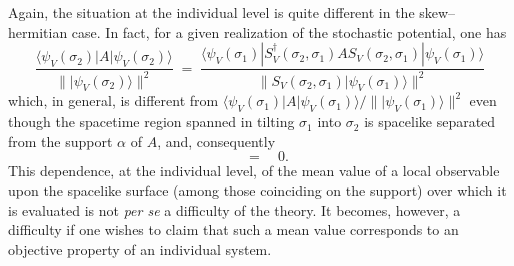 \documentclass[10pt,a4paper]{article}
\begin{document}
Again, the situation at the individual level is quite different in
the skew--hermitian case. In fact, for a given realization of the
stochastic potential, one has
\begin{equation}
\frac{\langle \psi_{V}(\sigma_{2})| A | \psi_{V}(\sigma_{2})
\rangle}{\| |\psi_{V}(\sigma_{2})\rangle \|^{2}} \; = \;
\frac{\langle \psi_{V}(\sigma_{1})| S_{V}^{\dagger}(\sigma_{2},
\sigma_{1}) A S_{V}(\sigma_{2}, \sigma_{1}) | \psi_{V}(\sigma_{1})
\rangle}{\| S_{V}(\sigma_{2}, \sigma_{1})
|\psi_{V}(\sigma_{1})\rangle \|^{2}}
\end{equation}
which, in general, is different from $\langle
\psi_{V}(\sigma_{1})| A | \psi_{V}(\sigma_{1}) \rangle/\|
|\psi_{V}(\sigma_{1})\rangle \|^{2}$ even though the spacetime
region spanned in tilting $\sigma_{1}$ into $\sigma_{2}$ is
spacelike separated from the support $\alpha$ of $A$, and,
consequently
\begin{equation}
[A, S_{V}(\sigma_{2}, \sigma_{1})] \quad = \quad 0.
\end{equation}
This dependence, at the individual level, of the mean value of a
local observable upon the spacelike surface (among those
coinciding on the support) over which it is evaluated is not {\it
per se} a difficulty of the theory. It becomes, however, a
difficulty if one wishes to claim that such a mean value
corresponds to an objective property of an individual system.
\end{document}
